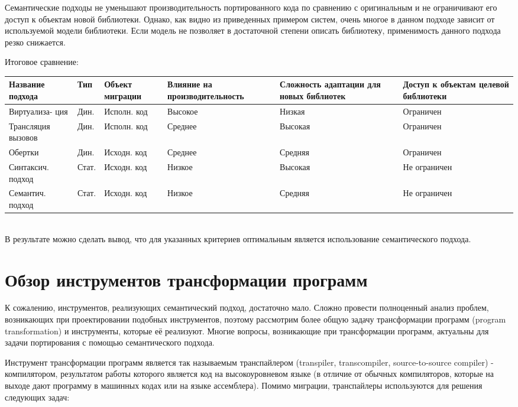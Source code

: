 Семантические подходы не уменьшают производительность портированного кода по сравнению с оригинальным и не ограничивают его доступ к объектам новой библиотеки. Однако, как видно из приведенных примером систем, очень многое в данном подходе зависит от используемой модели библиотеки. Если модель не позволяет в достаточной степени описать библиотеку, применимость данного подхода резко снижается.

Итоговое сравнение: \\

\begin{tabular}{|p{3cm}|p{1.2cm}|p{2cm}|p{3cm}|p{3cm}|p{3cm}|}
	\hline
	Название подхода & Тип & Объект миграции & Влияние на производительность & Сложность адаптации для новых библиотек & Доступ к объектам целевой библиотеки \\ 
	\hline
	Виртуализа- ция & Дин. & Исполн. код & Высокое & Низкая & Ограничен \\
	\hline
	Трансляция вызовов & Дин. & Исполн. код & Среднее & Высокая & Ограничен \\
	\hline
	Обертки & Дин. & Исходн. код & Среднее & Средняя & Ограничен \\
	\hline
	Синтаксич. подход & Стат. & Исходн. код & Низкое & Высокая & Не ограничен \\
	\hline
	Семантич. подход & Стат. & Исходн. код & Низкое & Средняя & Не ограничен \\
	\hline
\end{tabular} \\

В результате можно сделать вывод, что для указанных критериев оптимальным является использование семантического подхода.

\section{Обзор инструментов трансформации программ}
К сожалению, инструментов, реализующих семантический подход, достаточно мало. Сложно провести полноценный анализ проблем, возникающих при проектировании подобных инструментов, поэтому рассмотрим более общую задачу трансформации программ (program transformation) и инструменты, которые её реализуют. Многие вопросы, возникающие при трансформации программ, актуальны для задачи портирования с помощью семантического подхода.

Инструмент трансформации программ является так называемым транспайлером (transpiler, transcompiler, source-to-source compiler) - компилятором, результатом работы которого является код на высокоуровневом языке (в отличие от обычных компиляторов, которые на выходе дают программу в машинных кодах или на языке ассемблера). Помимо миграции, транспайлеры используются для решения следующих задач:


